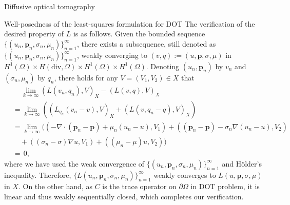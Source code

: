 \documentclass[11pt]{article}%
\renewcommand{\_}{{\fontfamily{ptm}\selectfont\textunderscore}}
\theoremstyle{plain}
\numberwithin{equation}{section}
\newcommand{\m}[1]{\ensuremath{\mathbf{#1}}}
\begin{document}
\begin{section}{Diffusive optical tomography}
\begin{subsection}{Well-posedness of the least-squares formulation for DOT}
The verification of the desired property of $L$ is as follows.  Given the bounded sequence  $\{(u_n, \m{p}_n,\sigma_n,\mu_n)\}_{n=1}^\infty$, there exists a subsequence, still denoted as $\{(u_n, \m{p}_n,\sigma_n,\mu_n)\}_{n=1}^\infty$, weakly converging to $(v,q):=(u, \m{p},\sigma,\mu)$ in $H^1(\Omega)\times H(\text{div},\Omega)\times H^1(\Omega)\times H^1(\Omega)$. Denoting $(u_n,\m{p}_n)$ by $v_n$ and $(\sigma_n,\mu_n)$ by $q_n$, there holds for any $V=(V_1,V_2)\in X$ that
 \begin{equation*}
\begin{split}
&\,\quad \lim_{k\to\infty}(L(v_n, q_n), V)_X-(L(v, q), V)_X\\
&=\lim_{k\to\infty}((L_{q_n}(v_n-v), V)_X+(L(v, q_n-q), V)_X)\\
&=\lim_{k\to\infty}\big((-\nabla\cdot (\m{p}_n-\m{p})+\mu_n(u_n-u),V_1)+ ((\m{p}_n-\m{p})-\sigma_n\nabla(u_n-u),V_2)\\
&\quad +((\sigma_n-\sigma)\nabla u, V_1)+((\mu_n-\mu)u,V_2)\big)\\
&=\,0,
\end{split}
\end{equation*}
where we have used the weak convergence of $\{(u_n, \m{p}_n,\sigma_n,\mu_n)\}_{n=1}^\infty$ and H\"{o}lder's inequality.  Therefore, $\{L(u_n, \m{p}_n,\sigma_n,\mu_n)\}_{n=1}^\infty$ weakly converges to $L(u, \m{p},\sigma,\mu)$ in $X$.
On the other hand, as $C$ is the trace operator on $\partial \Omega$ in DOT problem, it is linear and thus weakly sequentially closed, which completes our verification.


\end{subsection}
\end{section}
\end{document}
